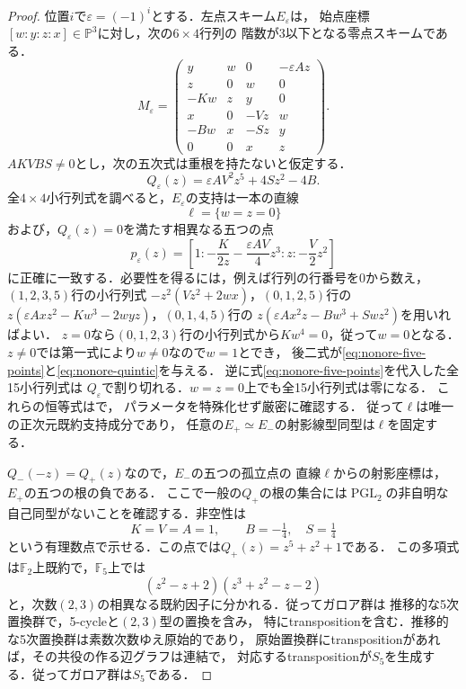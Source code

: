 \begin{proof}
位置$i$で$\varepsilon=(-1)^i$とする．左点スキーム$E_\varepsilon$は，
始点座標$[w:y:z:x]\in\mathbb P^3$に対し，次の$6\times4$行列の
階数が$3$以下となる零点スキームである．
\begin{equation}\label{eq:nonore-point-matrix}
 M_\varepsilon=\begin{pmatrix}
 y&w&0&-\varepsilon Az\\
 z&0&w&0\\
 -Kw&z&y&0\\
 x&0&-Vz&w\\
 -Bw&x&-Sz&y\\
 0&0&x&z
 \end{pmatrix}.
\end{equation}
$AKVBS\ne0$とし，次の五次式は重根を持たないと仮定する．
\begin{equation}\label{eq:nonore-quintic}
 Q_\varepsilon(z)=\varepsilon AV^2z^5+4Sz^2-4B.
\end{equation}
全$4\times4$小行列式を調べると，$E_\varepsilon$の支持は一本の直線
\[
 \ell=\{w=z=0\}
\]
および，$Q_\varepsilon(z)=0$を満たす相異なる五つの点
\begin{equation}\label{eq:nonore-five-points}
 p_\varepsilon(z)=
 \left[1:-\frac K{2z}-\frac{\varepsilon AV}4z^3:
              z:-\frac V2z^2\right]
\end{equation}
に正確に一致する．必要性を得るには，例えば行列の行番号を$0$から数え，
$(1,2,3,5)$行の小行列式
$-z^2(Vz^2+2wx)$，$(0,1,2,5)$行の
$z(\varepsilon Axz^2-Kw^3-2wyz)$，$(0,1,4,5)$行の
$z(\varepsilon Ax^2z-Bw^3+Swz^2)$を用いればよい．
$z=0$なら$(0,1,2,3)$行の小行列式から$Kw^4=0$，従って$w=0$となる．
$z\ne0$では第一式により$w\ne0$なので$w=1$とでき，
後二式が\eqref{eq:nonore-five-points}と\eqref{eq:nonore-quintic}を与える．
逆に式\eqref{eq:nonore-five-points}を代入した全15小行列式は
$Q_\varepsilon$で割り切れる．$w=z=0$上でも全15小行列式は零になる．
これらの恒等式はで，
パラメータを特殊化せず厳密に確認する．
従って$\ell$は唯一の正次元既約支持成分であり，
任意の$E_+\simeq E_-$の射影線型同型は$\ell$を固定する．

$Q_-( -z)=Q_+(z)$なので，$E_-$の五つの孤立点の
直線$\ell$からの射影座標は，$E_+$の五つの根の負である．
ここで一般の$Q_+$の根の集合には$\operatorname{PGL}_2$の非自明な
自己同型がないことを確認する．非空性は
\[
 K=V=A=1,\qquad B=-\tfrac14,\quad S=\tfrac14
\]
という有理数点で示せる．この点では$Q_+(z)=z^5+z^2+1$である．
この多項式は$\mathbb F_2$上既約で，$\mathbb F_5$上では
\[
 (z^2-z+2)(z^3+z^2-z-2)
\]
と，次数$(2,3)$の相異なる既約因子に分かれる．従ってガロア群は
推移的な5次置換群で，5-cycleと$(2,3)$型の置換を含み，
特にtranspositionを含む．推移的な5次置換群は素数次数ゆえ原始的であり，
原始置換群にtranspositionがあれば，その共役の作る辺グラフは連結で，
対応するtranspositionが$S_5$を生成する．従ってガロア群は$S_5$である．


\end{proof}
